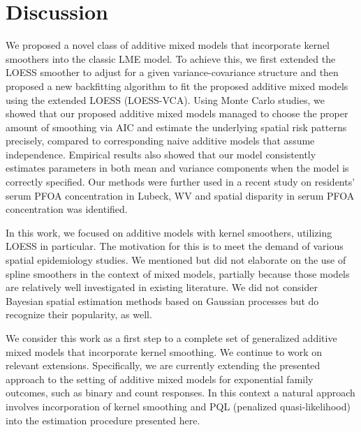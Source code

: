 	\section{Discussion}
	\label{s:discuss}
	We proposed a novel class of additive mixed models that incorporate kernel smoothers into the classic LME model. To achieve this, we first extended the LOESS smoother to adjust for a given variance-covariance structure and then proposed a new backfitting algorithm to fit the proposed additive mixed models using the extended LOESS (LOESS-VCA). Using Monte Carlo studies, we showed that our proposed additive mixed models managed to choose the proper amount of smoothing via AIC and estimate the underlying spatial risk patterns precisely, compared to corresponding naive additive models that assume independence. Empirical results also showed that our model consistently estimates parameters in both mean and variance components when the model is correctly specified. Our methods were further used in a recent study on residents' serum PFOA concentration in Lubeck, WV and spatial disparity in serum PFOA concentration was identified. 
	
	In this work, we focused on additive models with kernel smoothers, utilizing LOESS in particular. The motivation for this is to meet the demand of various spatial epidemiology studies. We mentioned but did not elaborate on the use of spline smoothers in the context of mixed models, partially because those models are relatively well investigated in existing literature. We did not consider Bayesian spatial estimation methods based on Gaussian processes but do recognize their popularity, as well.
	
	We consider this work as a first step to a complete set of generalized additive mixed models that incorporate kernel smoothing. We continue to work on relevant extensions. Specifically, we are currently extending the presented approach to the setting of additive mixed models for exponential family outcomes, such as binary and count responses. In this context a natural approach involves incorporation of kernel smoothing and PQL (penalized quasi-likelihood) \citep{breslow1993approximate} into the estimation procedure presented here.
	
